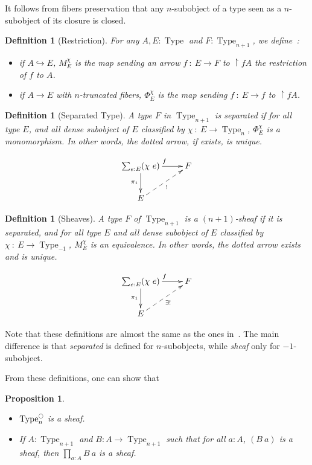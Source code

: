 \documentclass[conference]{IEEEtran}
\newtheorem{prop}[thm]{Proposition}
\newtheorem{defi}[thm]{Definition}
\DeclareMathOperator{\Type}{Type}
\newcommand{\modal}{\ensuremath{\ocircle}}
\begin{document}
It follows from fibers preservation that any $n$-subobject of a type seen as a $n$-subobject
of its closure is closed.

\begin{defi}[Restriction]
  For any $A, E:\Type$ and $F:\Type_{n+1}$, we define~:
  \begin{itemize}
  \item if $A \hookrightarrow E$, $M_E^\chi$ is the map sending an
    arrow $f~:~E\to F$ to $\restriction f A$ the restriction of $f$ to $A$.
  \item if $A \to E$ with $n$-truncated fibers, $\Phi_E^\chi$ is the
    map sending $f~:~E \to f$ to $\restriction f A$.
  \end{itemize}
\end{defi}

\begin{defi}[Separated Type]
  A type $F$ in $\Type_{n+1}$ is {\em separated} if for all type $E$, and
  all dense subobject of $E$ classified by $\chi~:~E \to \Type_n$,
  $\Phi_E^\chi$ is a monomorphism. In other words, the dotted arrow,
  if exists, is unique.

  $$\xymatrix{
    \sum_{e:E} (\chi~ e) \ar[r]^f \ar[d]_{\pi_1} & F \\
    E \ar@{-->}[ru]_{!}&
  }$$
\end{defi}

\begin{defi}[Sheaves]
  A type $F$ of $\Type_{n+1}$ is a {\em $(n+1)$-sheaf} if it is
  separated, and for all type $E$ and all dense subobject of $E$
  classified by $\chi~:~E \to \Type_{-1}$, $M_E^\chi$ is an
  equivalence. In other words, the dotted arrow exists and is unique.

  $$\xymatrix{
    \sum_{e:E} (\chi~ e) \ar[r]^f \ar[d]_{\pi_1} & F \\
    E \ar@{-->}[ru]_{\exists !}&
  }$$
\end{defi}

Note that these definitions are almost the same as the ones
in~\cite{maclanemoerdijk}. The main difference is that {\em separated}
is defined for $n$-subobjects,
while {\em sheaf} only for $-1$-subobject.

From these definitions, one can show that
\begin{prop}\label{prop:sheaf_prop}
  \begin{itemize}
  \item $\Type_n^\modal$ is a sheaf.
  \item If $A:\Type_{n+1}$ and $B:A \to \Type_{n+1}$ such that for all
    $a:A$, $(B~a)$ is a sheaf, then $\prod_{a:A}B~a$ is a sheaf.
  \end{itemize}
\end{prop}
\end{document}
